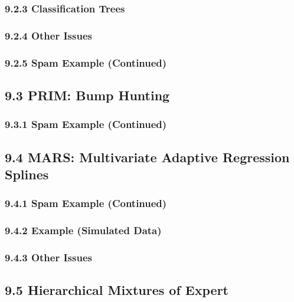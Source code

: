 \documentclass[11pt]{article}
\begin{document}
\subsubsection{9.2.3 Classification Trees}\label{classification-trees}

\subsubsection{9.2.4 Other Issues}\label{other-issues}

\subsubsection{9.2.5 Spam Example
(Continued)}\label{spam-example-continued}

\subsection{9.3 PRIM: Bump Hunting}\label{prim-bump-hunting}

\subsubsection{9.3.1 Spam Example
(Continued)}\label{spam-example-continued-1}

\subsection{9.4 MARS: Multivariate Adaptive Regression
Splines}\label{mars-multivariate-adaptive-regression-splines}

\subsubsection{9.4.1 Spam Example
(Continued)}\label{spam-example-continued-2}

\subsubsection{9.4.2 Example (Simulated
Data)}\label{example-simulated-data}

\subsubsection{9.4.3 Other Issues}\label{other-issues-1}

\subsection{9.5 Hierarchical Mixtures of
Expert}\label{hierarchical-mixtures-of-expert}
\end{document}
